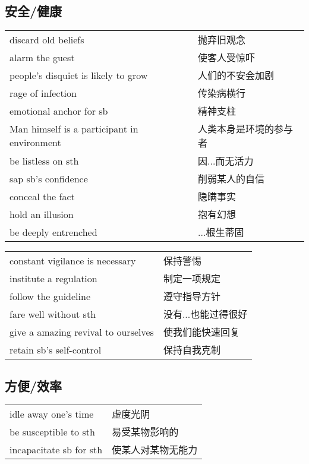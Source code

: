 \subsection{安全/健康}

\begin{tabular}{ll}
    discard old beliefs                         & 抛弃旧观念       \\
    alarm the guest                             & 使客人受惊吓      \\
    people's disquiet is likely to grow         & 人们的不安会加剧    \\
    rage of infection                           & 传染病横行       \\
    emotional anchor for sb                     & 精神支柱        \\
    Man himself is a participant in environment & 人类本身是环境的参与者 \\
    be listless on sth                          & 因...而无活力    \\
    sap sb's confidence                         & 削弱某人的自信     \\
    conceal the fact                            & 隐瞒事实        \\
    hold an illusion                            & 抱有幻想        \\
    be deeply entrenched                        & ...根生蒂固     \\
\end{tabular}

\begin{tabular}{ll}
    constant vigilance is necessary     & 保持警惕        \\
    institute a regulation              & 制定一项规定      \\
    follow the guideline                & 遵守指导方针      \\
    fare well without sth               & 没有...也能过得很好 \\
    give a amazing revival to ourselves & 使我们能快速回复    \\
    retain sb's self-control            & 保持自我克制      \\
\end{tabular}

\subsection{方便/效率}

\begin{tabular}{ll}
    idle away one's time    & 虚度光阴      \\
    be susceptible to sth   & 易受某物影响的   \\
    incapacitate sb for sth & 使某人对某物无能力 \\
\end{tabular}

